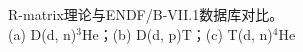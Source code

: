 \begin{figure}[H]
\begin{subfigure}{1\textwidth}
	\end{subfigure}
	\caption{R-matrix理论与ENDF/B-VII.1数据库对比。\\ (a) D(d, n)$^{\text{3}}$He；(b) D(d, p)T；(c) T(d, n)$ ^{\text{4}} $He}
	\label{fig:section_compare}
\end{figure}